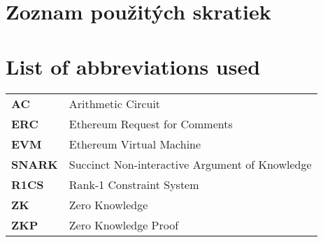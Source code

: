 \thispagestyle{plain}

\ifx\FIITlagEN\undefined
    \section*{\Huge Zoznam použitých skratiek}
\else
    \section*{\Huge List of abbreviations used}
\fi
\vskip 1cm

\begin{tabular}{ >{\bfseries}m{2cm} m{10cm} }
	AC  & Arithmetic Circuit       	\\
	ERC & Ethereum Request for Comments \\
	EVM & Ethereum Virtual Machine 	\\
	SNARK & Succinct Non-interactive Argument of Knowledge \\
	R1CS & Rank-1 Constraint System \\
	ZK  & Zero Knowledge           	\\
	ZKP & Zero Knowledge Proof
\end{tabular}

\begin{tabular}{ >{\bfseries}m{2cm} m{10cm} }
\end{tabular}

\emptypage
